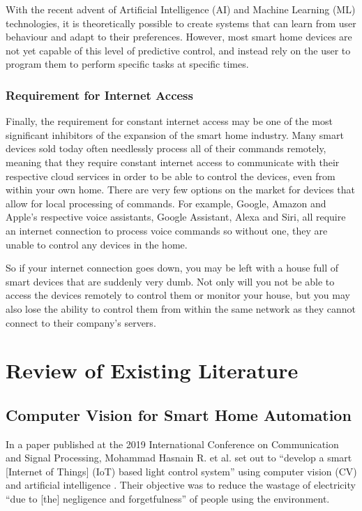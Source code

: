 With the recent advent of Artificial Intelligence (AI) and Machine Learning (ML) technologies, it is theoretically possible to create systems that can learn from user behaviour and adapt to their preferences.
However, most smart home devices are not yet capable of this level of predictive control, and instead rely on the user to program them to perform specific tasks at specific times.

\subsubsection{Requirement for Internet Access}
Finally, the requirement for constant internet access may be one of the most significant inhibitors of the expansion of the smart home industry.
Many smart devices sold today often needlessly process all of their commands remotely, meaning that they require constant internet access to communicate with their respective cloud services in order to be able to control the devices, even from within your own home.
There are very few options on the market for devices that allow for local processing of commands.
For example, Google, Amazon and Apple's respective voice assistants, Google Assistant, Alexa and Siri, all require an internet connection to process voice commands so without one, they are unable to control any devices in the home.

So if your internet connection goes down, you may be left with a house full of smart devices that are suddenly very dumb.
Not only will you not be able to access the devices remotely to control them or monitor your house, but you may also lose the ability to control them from within the same network as they cannot connect to their company's servers.

\section{Review of Existing Literature}

\subsection{Computer Vision for Smart Home Automation}
In a paper published at the 2019 International Conference on Communication and Signal Processing, Mohammad Hasnain R. et al. set out to ``develop a smart [Internet of Things] (IoT) based light control system'' using computer vision (CV) and artificial intelligence \cite{Hasn19}.
Their objective was to reduce the wastage of electricity ``due to [the] negligence and forgetfulness'' of people using the environment.

